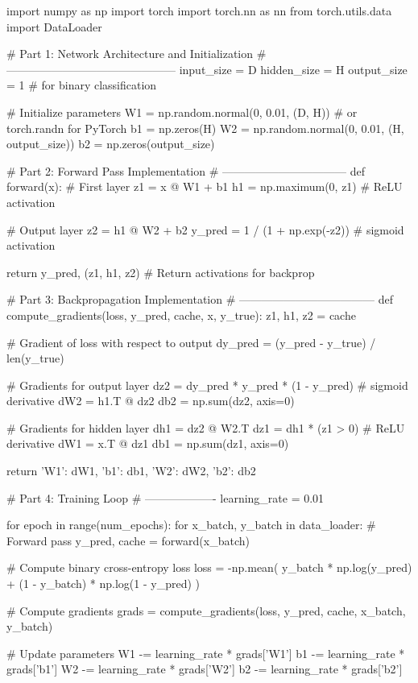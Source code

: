 \begin{pythoncode}
    import numpy as np
    import torch
    import torch.nn as nn
    from torch.utils.data import DataLoader
    
    # Part 1: Network Architecture and Initialization
    # ---------------------------------------------
    input_size = D
    hidden_size = H
    output_size = 1  # for binary classification
    
    # Initialize parameters
    W1 = np.random.normal(0, 0.01, (D, H))  # or torch.randn for PyTorch
    b1 = np.zeros(H)
    W2 = np.random.normal(0, 0.01, (H, output_size))
    b2 = np.zeros(output_size)
    
    
    # Part 2: Forward Pass Implementation
    # ---------------------------------
    def forward(x):
        # First layer
        z1 = x @ W1 + b1
        h1 = np.maximum(0, z1)  # ReLU activation
        
        # Output layer
        z2 = h1 @ W2 + b2
        y_pred = 1 / (1 + np.exp(-z2))  # sigmoid activation
        
        return y_pred, (z1, h1, z2)  # Return activations for backprop
    
    
    # Part 3: Backpropagation Implementation
    # ------------------------------------
    def compute_gradients(loss, y_pred, cache, x, y_true):
        z1, h1, z2 = cache
        
        # Gradient of loss with respect to output
        dy_pred = (y_pred - y_true) / len(y_true)
        
        # Gradients for output layer
        dz2 = dy_pred * y_pred * (1 - y_pred)  # sigmoid derivative
        dW2 = h1.T @ dz2
        db2 = np.sum(dz2, axis=0)
        
        # Gradients for hidden layer
        dh1 = dz2 @ W2.T
        dz1 = dh1 * (z1 > 0)  # ReLU derivative
        dW1 = x.T @ dz1
        db1 = np.sum(dz1, axis=0)
        
        return {'W1': dW1, 'b1': db1, 'W2': dW2, 'b2': db2}
    
    
    # Part 4: Training Loop
    # -------------------
    learning_rate = 0.01
    
    for epoch in range(num_epochs):
        for x_batch, y_batch in data_loader:
            # Forward pass
            y_pred, cache = forward(x_batch)
            
            # Compute binary cross-entropy loss
            loss = -np.mean(
                y_batch * np.log(y_pred) + 
                (1 - y_batch) * np.log(1 - y_pred)
            )
            
            # Compute gradients
            grads = compute_gradients(loss, y_pred, cache, x_batch, y_batch)
            
            # Update parameters
            W1 -= learning_rate * grads['W1']
            b1 -= learning_rate * grads['b1']
            W2 -= learning_rate * grads['W2']
            b2 -= learning_rate * grads['b2']
    \end{pythoncode}

